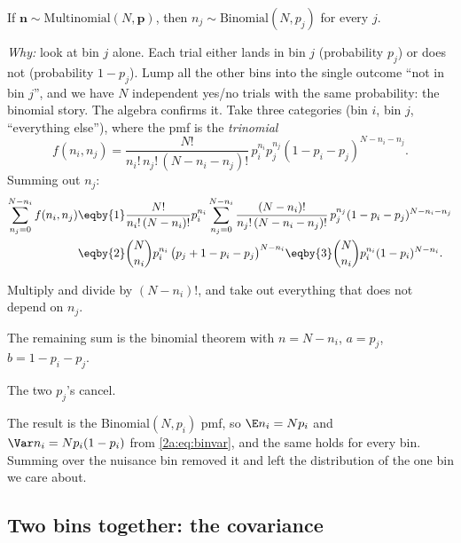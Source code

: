 \begin{keyidea}
If $\bm n\sim\mathrm{Multinomial}(N,\bm p)$, then $n_j\sim\mathrm{Binomial}(N,p_j)$ for every $j$.
\end{keyidea}
\emph{Why:} look at bin $j$ alone. Each trial either lands in bin $j$ (probability $p_j$) or does not (probability $1-p_j$). Lump all the other bins into the single outcome ``not in bin $j$'', and we have $N$ independent yes/no trials with the same probability: the binomial story. The algebra confirms it. Take three categories (bin $i$, bin $j$, ``everything else''), where the pmf is the \emph{trinomial}
\[
  f(n_i,n_j)=\frac{N!}{n_i!\,n_j!\,(N-n_i-n_j)!}\,p_i^{n_i}p_j^{n_j}(1-p_i-p_j)^{N-n_i-n_j}.
\]
Summing out $n_j$:
\begin{align*}
  \sum_{n_j=0}^{N-n_i} f(n_i,n_j)
  &\eqby{1} \frac{N!}{n_i!\,(N-n_i)!}p_i^{n_i}\sum_{n_j=0}^{N-n_i}\frac{(N-n_i)!}{n_j!\,(N-n_i-n_j)!}\,p_j^{n_j}(1-p_i-p_j)^{N-n_i-n_j}\\
  &\eqby{2} \binom N{n_i}p_i^{n_i}\,\bigl(p_j+1-p_i-p_j\bigr)^{N-n_i}
  \eqby{3} \binom N{n_i}p_i^{n_i}(1-p_i)^{N-n_i}.
\end{align*}
\begin{explain}
  \item Multiply and divide by $(N-n_i)!$, and take out everything that does not depend on $n_j$.
  \item The remaining sum is the binomial theorem with $n=N-n_i$, $a=p_j$, $b=1-p_i-p_j$.
  \item The two $p_j$'s cancel.
\end{explain}
The result is the Binomial$(N,p_i)$ pmf, so $\E n_i=Np_i$ and $\Var n_i=Np_i(1-p_i)$ from \eqref{2a:eq:binvar}, and the same holds for every bin. Summing over the nuisance bin removed it and left the distribution of the one bin we care about.

\subsection{Two bins together: the covariance}

